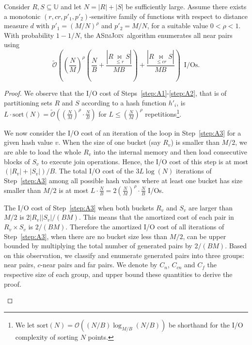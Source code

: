 \documentclass{llncs}
\newcommand{\Osymbol}{{\mathcal O}}
\newcommand{\BO}[1]{\Osymbol\left(#1\right)}
\newcommand{\TO}[1]{\tilde{\Osymbol}\left(#1\right)}
\newcommand{\ASimJoin}{\textsc{ASimJoin}}
\begin{document}
\begin{theorem}\label{thm:aware}
Consider $R, S \subseteq \mathbb{U}$ and let $N = |R|+|S|$ be sufficiently large. 
Assume there exists a monotonic $(r,cr,p'_1,p'_2)$-sensitive family of functions with respect to distance measure $d$ with $p'_1=(M/N)^\rho$ and $p'_2 = M/N$, for a suitable value $0< \rho < 1$.
With probability $1-1/N$, the \ASimJoin\ algorithm enumerates all near pairs 
using
$$
\TO{ \left(\frac{N}{M}\right)^\rho \left(
\frac{N}{B} +
\frac{|R \underset{\leq r}{\bowtie} S|}{M
B}\right)
+ \frac{|R \underset{\leq cr}{\bowtie} S|}{M B} } \enspace \text{I/Os}.
$$
\end{theorem}


\begin{proof}

We observe that the I/O cost of Steps~\ref{step:A1}-\ref{step:A2}, that is of partitioning sets $R$ and $S$ according to a hash function $h'_i$, is $L \cdot \text{sort}(N) = \TO{(\frac{N}{M})^\rho \cdot \frac{N}{B}}$ for $L \leq (\frac{N}{M})^\rho$ repetitions\footnote{We let $\text{sort}(N) = \BO{(N/B) \log_{M/B} (N/B)}$ be shorthand for the I/O complexity \cite{Vitter08} of sorting $N$ points.}. 

We now consider the I/O cost of an iteration of the loop in Step~\ref{step:A3} for a given hash value $v$. 
When the size of one bucket (say $R_v$) is smaller than $M/2$, we are able to load the whole $R_v$ into the internal memory and then load consecutive blocks of $S_v$ to execute join operations. 
Hence, the I/O cost of this step is at most $(|R_v|+|S_v|)/B$.
The total I/O cost of the $3L\log{(N)}$ iterations of Step~\ref{step:A3} among
all possible hash values where at least one bucket has size smaller than $M/2$
is at most $L \cdot \frac{N}{B} = 2(\frac{N}{M})^\rho \cdot \frac{N}{B}$  I/Os.

The I/O cost of Step~\ref{step:A3} when both buckets $R_v$ and $S_v$ are larger than $M/2$ is $2|R_v||S_v|/(BM)$. 
This means that the amortized cost of each pair in $R_v\times S_v$ is $2/(BM)$. 
Therefore the amortized I/O cost of all iterations of Step~\ref{step:A3}, when there are no bucket size less than $M/2$, can be upper bounded by multiplying the total number of generated pairs by $2/(BM)$.
Based on this observation, we classify and enumerate generated pairs into three groups: near pairs, $c$-near pairs and far pairs. We denote by $C_n$, $C_{cn}$ and $C_f$ the respective size of each group, and upper bound these quantities to derive the proof.
\begin{enumerate}


\end{enumerate}
\end{proof}
\end{document}
